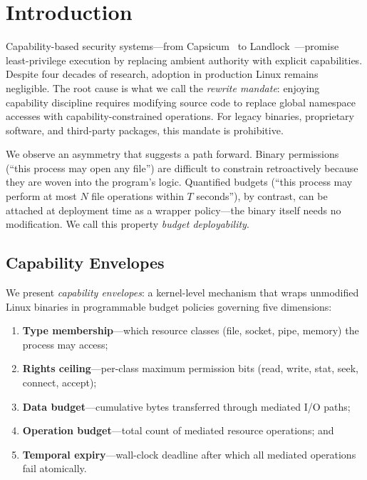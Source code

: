 \documentclass[letterpaper,twocolumn,10pt]{article}
\begin{document}
\section{Introduction}

Capability-based security systems---from Capsicum~\cite{watson2010capsicum}
to Landlock~\cite{landlock2023}---promise least-privilege execution by
replacing ambient authority with explicit capabilities.  Despite four
decades of research, adoption in production Linux remains negligible.
The root cause is what we call the \emph{rewrite mandate}: enjoying
capability discipline requires modifying source code to replace global
namespace accesses with capability-constrained operations.  For legacy
binaries, proprietary software, and third-party packages, this mandate
is prohibitive.

We observe an asymmetry that suggests a path forward.  Binary
permissions (``this process may open any file'') are difficult to
constrain retroactively because they are woven into the program's logic.
Quantified budgets (``this process may perform at most $N$ file
operations within $T$ seconds''), by contrast, can be attached at
deployment time as a wrapper policy---the binary itself needs no
modification.  We call this property \emph{budget deployability}.

\subsection{Capability Envelopes}

We present \emph{capability envelopes}: a kernel-level mechanism that
wraps unmodified Linux binaries in programmable budget policies
governing five dimensions:

\begin{enumerate}
\item \textbf{Type membership}---which resource classes (file, socket,
      pipe, memory) the process may access;
\item \textbf{Rights ceiling}---per-class maximum permission bits
      (read, write, stat, seek, connect, accept);
\item \textbf{Data budget}---cumulative bytes transferred through
      mediated I/O paths;
\item \textbf{Operation budget}---total count of mediated resource
      operations; and
\item \textbf{Temporal expiry}---wall-clock deadline after which all
      mediated operations fail atomically.
\end{enumerate}
\end{document}

